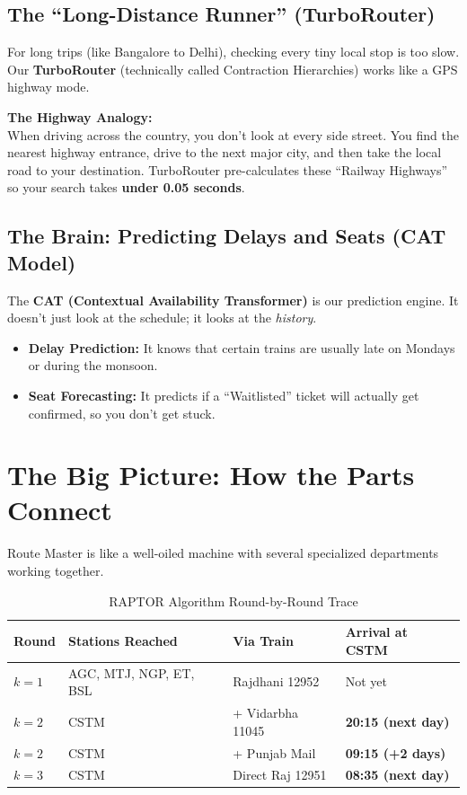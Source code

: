 \documentclass[12pt,a4paper]{report}
\begin{document}
\subsection{The ``Long-Distance Runner'' (TurboRouter)}

For long trips (like Bangalore to Delhi), checking every tiny local stop is too slow. Our \textbf{TurboRouter} (technically called Contraction Hierarchies) works like a GPS highway mode.

\begin{tcolorbox}[keybox]
\textbf{The Highway Analogy:}\\[0.4em]
When driving across the country, you don't look at every side street. You find the nearest highway entrance, drive to the next major city, and then take the local road to your destination. TurboRouter pre-calculates these ``Railway Highways'' so your search takes \textbf{under 0.05 seconds}.
\end{tcolorbox}

\subsection{The Brain: Predicting Delays and Seats (CAT Model)}

The \textbf{CAT (Contextual Availability Transformer)} is our prediction engine. It doesn't just look at the schedule; it looks at the \textit{history}.

\begin{itemize}[leftmargin=1.5em]
  \item \textbf{Delay Prediction:} It knows that certain trains are usually late on Mondays or during the monsoon.
  \item \textbf{Seat Forecasting:} It predicts if a ``Waitlisted'' ticket will actually get confirmed, so you don't get stuck.
\end{itemize}

\section{The Big Picture: How the Parts Connect}

Route Master is like a well-oiled machine with several specialized departments working together.

\begin{table}[h!]
\centering
\caption{RAPTOR Algorithm Round-by-Round Trace}
\begin{tabularx}{\textwidth}{lXXX}
\toprule
\textbf{Round} & \textbf{Stations Reached} & \textbf{Via Train} & \textbf{Arrival at CSTM} \\
\midrule
$k=1$ & AGC, MTJ, NGP, ET, BSL & Rajdhani 12952 & Not yet \\
$k=2$ & CSTM & + Vidarbha 11045 & \textbf{20:15 (next day)} \\
$k=2$ & CSTM & + Punjab Mail & \textbf{09:15 (+2 days)} \\
$k=3$ & CSTM & Direct Raj 12951 & \textbf{08:35 (next day)} \\
\bottomrule
\end{tabularx}
\end{table}
\end{document}

